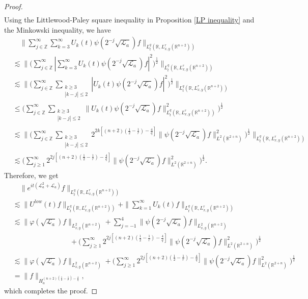 \documentclass[a4paper,11pt, reqno]{amsart}
\numberwithin{equation}{section}
\theoremstyle{plain}
\theoremstyle{definition}
\theoremstyle{remark}
\begin{document}
\begin{proof}
\begin{align*}
\end{align*}
Using the Littlewood-Paley square inequality in Proposition \ref{LP inequality} and the Minkowski inequality, we have
\begin{align*}
&\quad\|\sum_{j\in\mathbb{Z}}^\infty\sum_{k=3}^\infty U_k(t)\psi(2^{-j}\sqrt{\mathcal{L}_a})f\|_{L_t^q(\mathbb{R},L^r_{x,y}(\mathbb{R}^{n+2}))}\\
&\lesssim \|\Big(\sum_{j\in\mathbb{Z}}^\infty |\sum_{k=3}^\infty U_k(t)\psi(2^{-j}\sqrt{\mathcal{L}_a})f|^2\Big)^\frac{1}{2}\|_{L_t^q(\mathbb{R},L^r_{x,y}(\mathbb{R}^{n+2}))}\\
&\lesssim \|\Big(\sum_{j\in\mathbb{Z}}^\infty \sum_{\substack{k\geq 3\\ |k-j|\leq 2}} |U_k(t)\psi(2^{-j}\sqrt{\mathcal{L}_a})f|^2\Big)^\frac{1}{2}\|_{L_t^q(\mathbb{R},L^r_{x,y}(\mathbb{R}^{n+2}))}\\
&\leq \Big(\sum_{j\in\mathbb{Z}}^\infty \sum_{\substack{k\geq 3\\ |k-j|\leq 2}} \|U_k(t)\psi(2^{-j}\sqrt{\mathcal{L}_a})f\|_{L_t^q(\mathbb{R},L^r_{x,y}(\mathbb{R}^{n+2}))}^2\Big)^\frac{1}{2}\\
&\lesssim \|\Big(\sum_{j\in\mathbb{Z}}^\infty \sum_{\substack{k\geq 3\\ |k-j|\leq 2}} 2^{2k[(n+2)(\frac{1}{2}-\frac{1}{r})-\frac{4}{q}]}\|\psi(2^{-j}\sqrt{\mathcal{L}_a})f\|^2_{L^2(\mathbb{R}^{2+n})}\Big)^\frac{1}{2}\|_{L_t^q(\mathbb{R},L^r_{x,y}(\mathbb{R}^{n+2}))}\\
&\lesssim \Big(\sum_{j\geq1}^\infty 2^{2j[(n+2)(\frac{1}{2}-\frac{1}{r})-\frac{4}{q}]}\|\psi(2^{-j}\sqrt{\mathcal{L}_a})f\|^2_{L^2(\mathbb{R}^{2+n})}\Big)^\frac{1}{2}.
\end{align*}
Therefore, we get
\begin{align*}
&\quad \|e^{it(\mathcal{L}_a^2+\mathcal{L}_a)}f\|_{L_t^q(\mathbb{R},L^r_{x,y}(\mathbb{R}^{n+2}))}\\
&\lesssim \|U^{low}(t)f\|_{L_t^q(\mathbb{R},L^r_{x,y}(\mathbb{R}^{n+2}))}+\|\sum_{k=1}^\infty U_k(t)f\|_{L_t^q(\mathbb{R},L^r_{x,y}(\mathbb{R}^{n+2}))}\\
&\lesssim\|\varphi(\sqrt{\mathcal{L}_a})f\|_{L^2_{x,y}(\mathbb{R}^{n+2})}+\sum_{j=-1}^4\|\psi(2^{-j}\sqrt{\mathcal{L}_a})f\|_{L^2_{x,y}(\mathbb{R}^{n+2})}\\
&\qquad\qquad\qquad\qquad+\Big(\sum_{j\geq1}^\infty 2^{2j[(n+2)(\frac{1}{2}-\frac{1}{r})-\frac{4}{q}]}\|\psi(2^{-j}\sqrt{\mathcal{L}_a})f\|^2_{L^2(\mathbb{R}^{2+n})}\Big)^\frac{1}{2}\\
&\lesssim\|\varphi(\sqrt{\mathcal{L}_a})f\|_{L^2_{x,y}(\mathbb{R}^{n+2})}+\Big(\sum_{j\geq1}^\infty 2^{2j[(n+2)(\frac{1}{2}-\frac{1}{r})-\frac{4}{q}]}\|\psi(2^{-j}\sqrt{\mathcal{L}_a})f\|^2_{L^2(\mathbb{R}^{2+n})}\Big)^\frac{1}{2}\\
&=\|f\|_{H_a^{(n+2)(\frac{1}{2}-\frac{1}{r})-\frac{4}{q}}},
\end{align*}
which completes the proof.
\end{proof}
\end{document}
